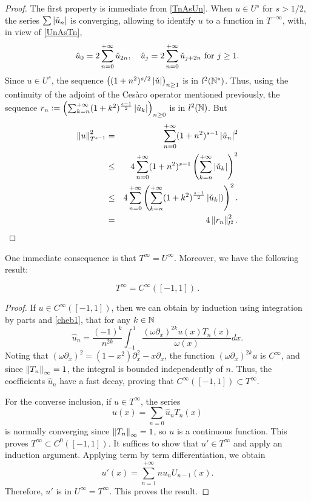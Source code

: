 \documentclass[a4paper]{article}
\begin{document}
\begin{proof}
	The first property is immediate from \eqref{TnAsUn}. 
	When $u \in U^{s}$ for $s > 1/2$, the series $\sum \left\lvert \check{u}_n \right\rvert$ is converging, allowing to identify $u$ to a function in $T^{-\infty}$, with, in view of \eqref{UnAsTn}, 
	\[\hat{u}_{0} = 2\sum_{n=0}^{+ \infty} \check{u}_{2n}, \quad  \hat{u}_j = 2\sum_{n=0}^{+\infty} \check{u}_{j + 2n} \textup{ for } j \geq 1.\]
	Since $u \in U^s$, the sequence $\left((1+n^2)^{s/2} \left\lvert \check{u} \right\rvert\right)_{n \geq 1}$ is in $l^2(\mathbb{N}^*)$. Thus, using the continuity of the adjoint of the Cesàro operator mentioned previously, the sequence $r_n \mathrel{\mathop:}= \left( \sum_{k=n}^{+ \infty} (1+k^2)^{\frac{s-1}{2}} \left\lvert \check{u}_k \right\rvert\right)_{ n \geq 0}$ is in $l^2(\mathbb{N})$. But
	\begin{eqnarray*}
		\left\|u\right\|_{T^{s-1}}^2 &=& \sum_{n=0}^{+ \infty} (1 + n^2)^{s-1} \left\lvert \hat{u}_n \right\rvert^2\\ 
		&\leq& 4\sum_{n=0}^{+\infty}(1+n^2)^{s-1} \left(\sum_{k=n}^{+\infty} \left\lvert \check{u}_k \right\rvert\right)^2 \\
		&\leq& 4\sum_{n=0}^{+ \infty}\left(\sum_{k=n}^{+\infty}(1+k^2)^{\frac{s-1}{2}} \left\lvert \check{u}_k \right\rvert)\right)^2.\\
		&=& 4\left\|r_n\right\|^2_{l^2}.
	\end{eqnarray*}	
\end{proof}
\noindent One immediate consequence is that $T^{\infty} = U^{\infty}$.  Moreover, we have the following result:
\begin{Lem}
	\[T^{\infty} = C^{\infty}([-1,1])\,.\]
	\label{LemTinfCinf}
\end{Lem}
\begin{proof}
	If $u \in C^{\infty}([-1,1])$, then we can obtain by induction using integration by parts and \eqref{cheb1}, that for any $k \in \mathbb{N}$
	\[\hat{u}_n = \frac{(-1)^k}{n^{2k}} \int_{-1}^{1} \dfrac{(\omega\partial_x)^{2k} u(x) T_n(x)}{\omega(x)}dx.\]
	Noting that $(\omega \partial_x)^2 = (1-x^2)\partial_x^2 - x \partial_ x$, the function $(\omega \partial_x)^{2k}u$ is $C^{\infty}$, and since $\left\|T_n\right\|_\infty = 1$, the integral is bounded independently of $n$. Thus, the coefficients $\hat{u}_n$ have a fast decay, proving that $C^{\infty}([-1,1]) \subset T^{\infty}$. 
	
	For the converse inclusion, if $u \in T^{\infty}$, the series
	\[ u(x) = \sum_{n=0} \hat{u}_n T_n(x)\]
	is normally converging since $\left\|T_n\right\|_\infty = 1$, so $u$ is a continuous function. This proves $T^{\infty} \subset C^0([-1,1])$. It suffices to show that $u' \in T^{\infty}$ and apply an induction argument. Applying term by term differentiation, we obtain
	\[u'(x) = \sum_{n=1}^{+\infty} n u_n U_{n-1}(x).\] 
	Therefore, $u'$ is in $U^{\infty} = T^{\infty}$. This proves the result.
\end{proof}
\end{document}
